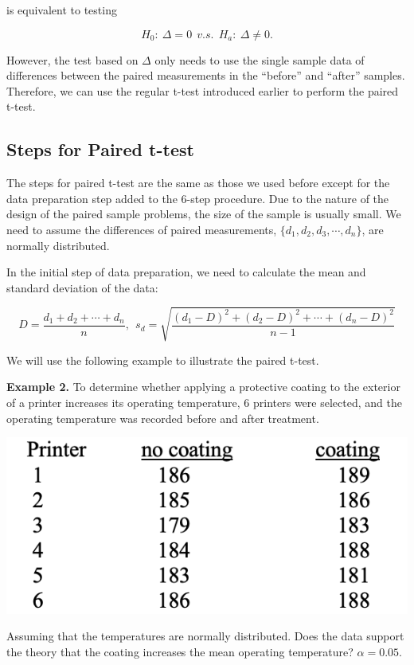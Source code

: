 \documentclass[
]{book}
\begin{document}
is equivalent to testing

\[
H_0: \ \Delta = 0 \ \ v.s. \ \ H_a: \ \Delta \ne 0.
\]

However, the test based on \(\Delta\) only needs to use the single sample data of differences between the paired measurements in the ``before'' and ``after'' samples. Therefore, we can use the regular t-test introduced earlier to perform the paired t-test.

\hfill\break

\hypertarget{steps-for-paired-t-test}{%
\subsection{Steps for Paired t-test}\label{steps-for-paired-t-test}}

The steps for paired t-test are the same as those we used before except for the data preparation step added to the 6-step procedure. Due to the nature of the design of the paired sample problems, the size of the sample is usually small. We need to assume the differences of paired measurements, \(\{d_1, d_2, d_3, \cdots, d_n \}\), are normally distributed.

In the initial step of data preparation, we need to calculate the mean and standard deviation of the data:

\[D=\frac{d_1 + d_2 + \cdots + d_n}{n}, \ \ s_d = \sqrt{\frac{(d_1 - D)^2 + (d_2 - D)^2 + \cdots + (d_n - D)^2}{n-1}}\]

We will use the following example to illustrate the paired t-test.

\textbf{Example 2.} To determine whether applying a protective coating to the exterior of a printer increases its operating temperature, 6 printers were selected, and the operating temperature was recorded before and after treatment.

\begin{center}\includegraphics[width=0.4\linewidth]{week10/coatingData} \end{center}

Assuming that the temperatures are normally distributed. Does the data support the theory that the coating increases the mean operating temperature? \(\alpha = 0.05\).
\end{document}
